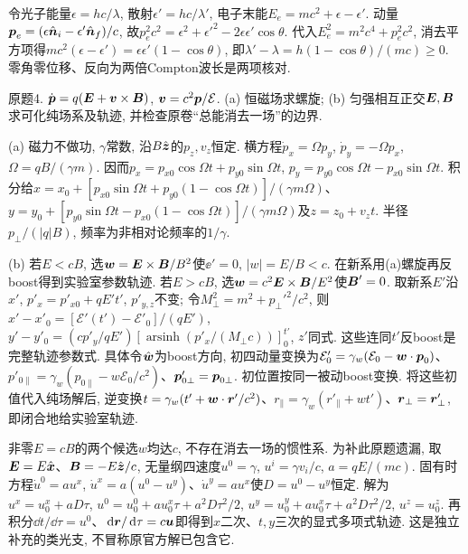 \begin{solution}
令光子能量$\epsilon=hc/\lambda$, 散射$\epsilon'=hc/\lambda'$, 电子末能$E_e=mc^2+\epsilon-\epsilon'$. 动量$\boldsymbol{p}_e=(\epsilon\hat{\boldsymbol{n}}_i-\epsilon'\hat{\boldsymbol{n}}_f)/c$, 故$p_e^2c^2=\epsilon^2+\epsilon'^2-2\epsilon\epsilon'\cos\theta$. 代入$E_e^2=m^2c^4+p_e^2c^2$, 消去平方项得$mc^2(\epsilon-\epsilon')=\epsilon\epsilon'(1-\cos\theta)$, 即$\lambda'-\lambda=h(1-\cos\theta)/(mc)\ge0$. 零角零位移、反向为两倍Compton波长是两项核对.
\end{solution}
\begin{exercise}
原题4. $\dot{\boldsymbol{p}}=q(\boldsymbol{E}+\boldsymbol{v}\times\boldsymbol{B})$, $\boldsymbol{v}=c^2\boldsymbol{p}/\mathcal E$. (a) 恒磁场求螺旋; (b) 匀强相互正交$\boldsymbol{E},\boldsymbol{B}$求可化纯场系及轨迹, 并检查原卷“总能消去一场”的边界.
\end{exercise}
\begin{solution}
(a) 磁力不做功, $\gamma$常数, 沿$B\hat{\boldsymbol{z}}$的$p_z,v_z$恒定. 横方程$\dot p_x=\Omega p_y$, $\dot p_y=-\Omega p_x$, $\Omega=qB/(\gamma m)$. 因而$p_x=p_{x0}\cos\Omega t+p_{y0}\sin\Omega t$, $p_y=p_{y0}\cos\Omega t-p_{x0}\sin\Omega t$. 积分给$x=x_0+[p_{x0}\sin\Omega t+p_{y0}(1-\cos\Omega t)]/(\gamma m\Omega)$、$y=y_0+[p_{y0}\sin\Omega t-p_{x0}(1-\cos\Omega t)]/(\gamma m\Omega)$及$z=z_0+v_zt$. 半径$p_\perp/(|q|B)$, 频率为非相对论频率的$1/\gamma$.

(b) 若$E<cB$, 选$\boldsymbol{w}=\boldsymbol{E}\times\boldsymbol{B}/B^2$使$\ee'=0$, $|w|=E/B<c$. 在新系用(a)螺旋再反boost得到实验室参数轨迹. 若$E>cB$, 选$\boldsymbol{w}=c^2\boldsymbol{E}\times\boldsymbol{B}/E^2$使$\boldsymbol{B}'=0$. 取新系$E'$沿$x'$, $p'_x=p'_{x0}+qE't'$, $p'_{y,z}$不变; 令$M_\perp^2=m^2+p_\perp'^2/c^2$, 则$x'-x'_0=[\mathcal E'(t')-\mathcal E'_0]/(qE')$, $y'-y'_0=(cp'_y/qE')[\operatorname{arsinh}(p'_x/(M_\perp c))]_{0}^{t'}$, $z'$同式. 这些连同$t'$反boost是完整轨迹参数式. 具体令$\hat{\boldsymbol{w}}$为boost方向, 初四动量变换为$\mathcal E'_0=\gamma_w(\mathcal E_0-\boldsymbol{w}\cdot\boldsymbol{p}_0)$、$p'_{0\parallel}=\gamma_w(p_{0\parallel}-w\mathcal E_0/c^2)$、$\boldsymbol{p}'_{0\perp}=\boldsymbol{p}_{0\perp}$. 初位置按同一被动boost变换. 将这些初值代入纯场解后, 逆变换$t=\gamma_w(t'+\boldsymbol{w}\cdot\boldsymbol{r}'/c^2)$、$r_\parallel=\gamma_w(r'_\parallel+wt')$、$\boldsymbol{r}_\perp=\boldsymbol{r}'_\perp$, 即闭合地给实验室轨迹.

非零$E=cB$的两个候选$w$均达$c$, 不存在消去一场的惯性系. 为补此原题遗漏, 取$\boldsymbol{E}=E\hat{\boldsymbol{x}}$、$\boldsymbol{B}=-E\hat{\boldsymbol{z}}/c$, 无量纲四速度$u^0=\gamma$, $u^i=\gamma v_i/c$, $a=qE/(mc)$. 固有时方程$\dot u^0=a u^x$, $\dot u^x=a(u^0-u^y)$、$\dot u^y=a u^x$使$D=u^0-u^y$恒定. 解为$u^x=u^x_0+aD\tau$, $u^0=u^0_0+au^x_0\tau+a^2D\tau^2/2$, $u^y=u^y_0+au^x_0\tau+a^2D\tau^2/2$, $u^z=u^z_0$. 再积分$\dd t/\dd\tau=u^0$、$\,\mathrm d\boldsymbol{r}/\,\mathrm d\tau=c\boldsymbol{u}$即得到$x$二次、$t,y$三次的显式多项式轨迹. 这是独立补充的类光支, 不冒称原官方解已包含它.
\end{solution}
